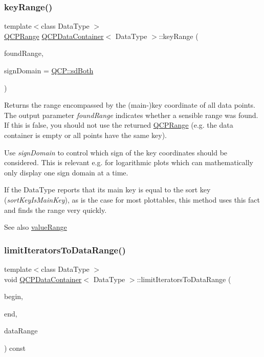 \subsubsection{\texorpdfstring{key\+Range()}{keyRange()}}
{\footnotesize\ttfamily template$<$class Data\+Type $>$ \\
\hyperlink{classQCPRange}{Q\+C\+P\+Range} \hyperlink{classQCPDataContainer}{Q\+C\+P\+Data\+Container}$<$ Data\+Type $>$\+::key\+Range (\begin{DoxyParamCaption}\item[{bool \&}]{found\+Range,  }\item[{\hyperlink{namespaceQCP_afd50e7cf431af385614987d8553ff8a9}{Q\+C\+P\+::\+Sign\+Domain}}]{sign\+Domain = {\ttfamily \hyperlink{namespaceQCP_afd50e7cf431af385614987d8553ff8a9aa38352ef02d51ddfa4399d9551566e24}{Q\+C\+P\+::sd\+Both}} }\end{DoxyParamCaption})}

Returns the range encompassed by the (main-\/)key coordinate of all data points. The output parameter {\itshape found\+Range} indicates whether a sensible range was found. If this is false, you should not use the returned \hyperlink{classQCPRange}{Q\+C\+P\+Range} (e.\+g. the data container is empty or all points have the same key).

Use {\itshape sign\+Domain} to control which sign of the key coordinates should be considered. This is relevant e.\+g. for logarithmic plots which can mathematically only display one sign domain at a time.

If the Data\+Type reports that its main key is equal to the sort key ({\itshape sort\+Key\+Is\+Main\+Key}), as is the case for most plottables, this method uses this fact and finds the range very quickly.

\begin{DoxySeeAlso}{See also}
\hyperlink{classQCPDataContainer_a35a102dc2424d1228fc374d9313efbe9}{value\+Range} 
\end{DoxySeeAlso}
\mbox{\label{classQCPDataContainer_aa1b36f5ae86a5a5a0b92141d3a0945c4}} 
\subsubsection{\texorpdfstring{limit\+Iterators\+To\+Data\+Range()}{limitIteratorsToDataRange()}}
{\footnotesize\ttfamily template$<$class Data\+Type $>$ \\
void \hyperlink{classQCPDataContainer}{Q\+C\+P\+Data\+Container}$<$ Data\+Type $>$\+::limit\+Iterators\+To\+Data\+Range (\begin{DoxyParamCaption}\item[{const\+\_\+iterator \&}]{begin,  }\item[{const\+\_\+iterator \&}]{end,  }\item[{const \hyperlink{classQCPDataRange}{Q\+C\+P\+Data\+Range} \&}]{data\+Range }\end{DoxyParamCaption}) const}

